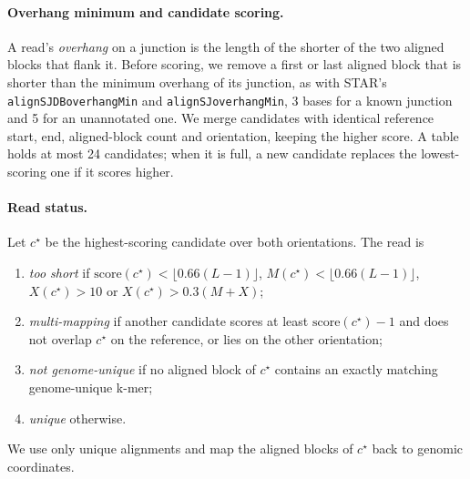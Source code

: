 \documentclass[11pt]{article}
\begin{document}
\paragraph{Overhang minimum and candidate scoring.} A read's \emph{overhang} on a junction is the length of the shorter of the two aligned blocks that flank it. Before scoring, we remove a first or last aligned block that is shorter than the minimum overhang of its junction, as with STAR's \texttt{alignSJDBoverhangMin} and \texttt{alignSJoverhangMin}, 3 bases for a known junction and 5 for an unannotated one. We merge candidates with identical reference start, end, aligned-block count and orientation, keeping the higher score. A table holds at most 24 candidates; when it is full, a new candidate replaces the lowest-scoring one if it scores higher.

\paragraph{Read status.} Let $c^\star$ be the highest-scoring candidate over both orientations. The read is
\begin{enumerate}[leftmargin=*]
  \item \emph{too short} if $\mathrm{score}(c^\star)<\lfloor0.66(L-1)\rfloor$, $M(c^\star)<\lfloor0.66(L-1)\rfloor$, $X(c^\star)>10$ or $X(c^\star)>0.3(M+X)$;
  \item \emph{multi-mapping} if another candidate scores at least $\mathrm{score}(c^\star)-1$ and does not overlap $c^\star$ on the reference, or lies on the other orientation;
  \item \emph{not genome-unique} if no aligned block of $c^\star$ contains an exactly matching genome-unique k-mer;
  \item \emph{unique} otherwise.
\end{enumerate}
We use only unique alignments and map the aligned blocks of $c^\star$ back to genomic coordinates.
\end{document}
